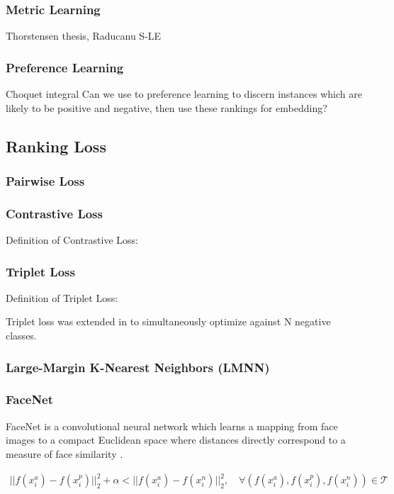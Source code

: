 \subsubsection{Metric Learning}
Thorstensen thesis, Raducanu S-LE

\subsubsection{Preference Learning}
Choquet integral
Can we use to preference learning to discern instances which are likely to be positive and negative, then use these rankings for embedding?

	\subsection{Ranking Loss}
	
	\subsubsection{Pairwise Loss}
	
	\subsubsection{Contrastive Loss}
	Definition of Contrastive Loss:
	
	
	\subsubsection{Triplet Loss}
	
	Definition of Triplet Loss:
	
	Triplet loss was extended in \citep{Sohn2016NPairLoss} to simultaneously optimize against N negative classes.

		\subsubsection{Large-Margin K-Nearest Neighbors (LMNN)}
		
		\subsubsection{FaceNet}
		
		FaceNet is a convolutional neural network which learns a mapping from face images to a compact Euclidean space where distances directly correspond to a measure of face similarity \citep{Schroff2015FaceNet}. 
		
		\begin{align}
			||f(x^{a}_{i}) - f(x^{p}_{i})||^{2}_{2} + \alpha < ||f(x^{a}_{i}) - f(x^{n}_{i})||^{2}_{2}, \quad \forall (f(x^{a}_{i}),f(x^{p}_{i}),f(x^{n}_{i})) \in \mathcal{T}
		\end{align} 
	
